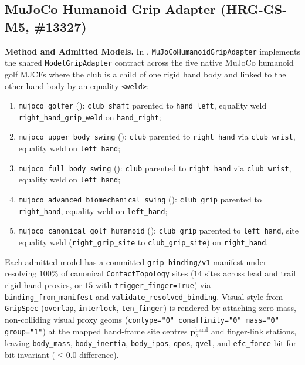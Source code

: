 \documentclass[11pt,a4paper]{article}
\begin{document}
\subsection{MuJoCo Humanoid Grip Adapter (HRG-GS-M5, \#13327)}
\textbf{Method and Admitted Models.}
In , \texttt{MuJoCoHumanoidGripAdapter} implements the shared \texttt{ModelGripAdapter} contract across the five native MuJoCo humanoid golf MJCFs where the club is a child of one rigid hand body and linked to the other hand body by an equality \texttt{<weld>}:
\begin{enumerate}[leftmargin=*,noitemsep]
\item \texttt{mujoco\_golfer} (): \texttt{club\_shaft} parented to \texttt{hand\_left}, equality weld \texttt{right\_hand\_grip\_weld} on \texttt{hand\_right};
\item \texttt{mujoco\_upper\_body\_swing} (): \texttt{club} parented to \texttt{right\_hand} via \texttt{club\_wrist}, equality weld on \texttt{left\_hand};
\item \texttt{mujoco\_full\_body\_swing} (): \texttt{club} parented to \texttt{right\_hand} via \texttt{club\_wrist}, equality weld on \texttt{left\_hand};
\item \texttt{mujoco\_advanced\_biomechanical\_swing} (): \texttt{club\_grip} parented to \texttt{right\_hand}, equality weld on \texttt{left\_hand};
\item \texttt{mujoco\_canonical\_golf\_humanoid} (): \texttt{club\_grip} parented to \texttt{left\_hand}, site equality weld (\texttt{right\_grip\_site} to \texttt{club\_grip\_site}) on \texttt{right\_hand}.
\end{enumerate}
Each admitted model has a committed \texttt{grip-binding/v1} manifest under  resolving $100\%$ of canonical \texttt{ContactTopology} sites ($14$ sites across lead and trail rigid hand proxies, or $15$ with \texttt{trigger\_finger=True}) via \texttt{binding\_from\_manifest} and \texttt{validate\_resolved\_binding}. Visual style from \texttt{GripSpec} (\texttt{overlap}, \texttt{interlock}, \texttt{ten\_finger}) is rendered by attaching zero-mass, non-colliding visual proxy geoms (\texttt{contype="0" conaffinity="0" mass="0" group="1"}) at the mapped hand-frame site centres $\mathbf{p}_{s}^{\mathrm{hand}}$ and finger-link stations, leaving \texttt{body\_mass}, \texttt{body\_inertia}, \texttt{body\_ipos}, \texttt{qpos}, \texttt{qvel}, and \texttt{efc\_force} bit-for-bit invariant ($\le 0.0$ difference).
\end{document}
